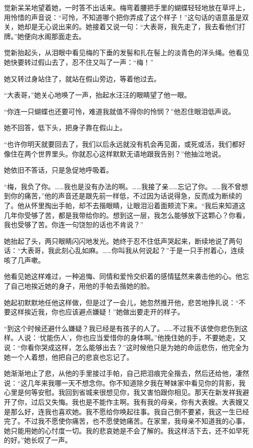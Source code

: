 \par 觉新呆呆地望着她，一时答不出话来。梅弯着腰把手里的蝴蝶轻轻地放在草坪上，用怜惜的声音说：“可怜，不知道哪个把你弄成了这个样子！”这句话的语意虽是双关，她却是无心说出来的。她接着又说一句：“大表哥，我先走了，我去看他们打牌。”她便向水阁那面走去。
\par 觉新抬起头，从泪眼中看见梅的下垂的发髻和扎在髻上的淡青色的洋头绳。他看见她快要转过假山去了，忍不住又叫了一声：“梅！”
\par 她又转过身站住了，就站在假山旁边，等着他过去。
\par “大表哥，”她关心地唤了一声，抬起水汪汪的眼睛望了他一眼。
\par “你连一只蝴蝶也还要可怜，难道我就值不得你的怜悯？”他忍住眼泪低声说。
\par 她不回答，低下头，把身子靠在假山上。
\par “也许你明天就要回去了，我们以后永远就没有机会再见面，或死或活，我们都好像住在两个世界里头。你就忍心这样默默无语地跟我告别？”他抽泣地说。
\par 她依旧不答话，只是急促地呼吸着。
\par “梅，我负了你。……我也是没有办法的啊。……我接了亲……忘记了你。……我不曾想到你的痛苦，”他的声音还是跟先前一样低，不过因为话说得急，反而成为断续的了。他从怀里掏出手帕，却不去揩眼睛，让眼泪沿着面颊流下来。“我后来知道这几年你受够了苦，都是我带给你的。想到这一层，我怎么能够放下这颗心？你看，我也受够了苦。你连一句饶恕的话也不肯说？”
\par 她抬起了头，两只眼睛闪闪地发光。她终于忍不住低声哭起来，断续地说了两句话：“大表哥，我此刻心乱如麻。……你叫我从何说起？”于是一只手拊着心，连续咳了几声嗽。
\par 他看见她这样难过，一种追悔、同情和爱怜交织着的感情猛然来袭击他的心。他忘了自己地挨近她的身子，用他的手帕去揩她的脸。
\par 她起初默默地任他这样做，但是过了一会儿，她忽然推开他，悲苦地挣扎说：“不要这样挨近我，你也应该避点嫌疑！”她做出要走开的样子。
\par “到这个时候还避什么嫌疑？我已经是有孩子的人了。……不过我不该使你悲伤到这样。人说：‘忧能伤人’，你也应当爱惜你的身体啊。”他挽住她的手，不要她走，又说：“你看你哭成这样，怎么能够出去？”这时候他只是为她的命运悲伤，他完全为她一个人着想，他把自己的悲哀也忘记了。
\par 她渐渐地止了悲，从他的手里接过手帕，自己把泪痕完全揩去，然后还给他，凄然说：“这几年来我哪一天不想念你。你不知道除夕我在琴妹家中看见你的背影，我心里是何等安慰。我回到省城来很想见你，我又害怕跟你相见。那天在新发祥我避开了你，过后又失悔。我也是不能作主啊。我有我的母亲，你有大表嫂。大表嫂又是那么好，连我也喜欢她。我不愿给你唤起往事。我自己倒不要紧，我这一生已经完了。不过我不愿使你痛苦，也不愿使她痛苦。在家里，我母亲不知道我的心事，她只能用她的心忖度一切。我的悲哀她是不会了解的。我这样活下去，还不如早死的好。”她长叹了一声。
